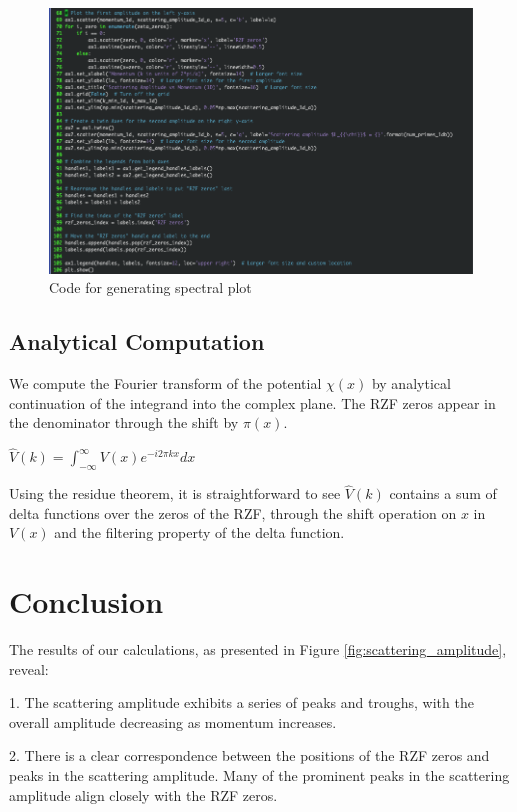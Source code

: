 \documentclass[11pt, oneside]{article}
\begin{document}
\begin{figure}[htbp]
\begin{center}
    \includegraphics[width=0.8\linewidth]{../images/plotting_code.png}
\caption{Code for generating spectral plot}
\label{fig:plotting_code}
\end{center}
\end{figure}

\subsection{Analytical Computation}
We compute the Fourier transform of the potential $\chi(x)$ by analytical continuation of the integrand into the complex plane. 
The RZF zeros appear in the denominator through the shift by $\pi(x)$. 
 
$\hat{V}(k) = \int_{-\infty}^{\infty}V(x)e^{-i2\pi kx}dx$
 
Using the residue theorem, it is straightforward to see $\hat{V}(k)$ contains a sum of delta functions over the zeros of the RZF, through the shift operation on $x$ in $V(x)$ and the filtering property of the delta function.

\section{Conclusion}

The results of our calculations, as presented in Figure \ref{fig:scattering_amplitude}, reveal:

1. The scattering amplitude exhibits a series of peaks and troughs, with the overall amplitude decreasing as momentum increases.

2. There is a clear correspondence between the positions of the RZF zeros and peaks in the scattering amplitude. Many of the prominent peaks in the scattering amplitude align closely with the RZF zeros.
\end{document}
